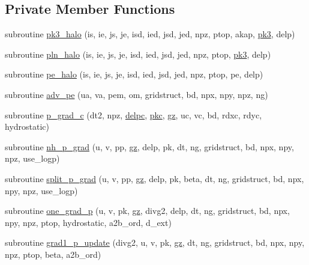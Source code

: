 \subsection*{Private Member Functions}
\begin{DoxyCompactItemize}
\item 
subroutine \hyperlink{classdyn__core__mod_acb7593139a5dd1dd95e85ea109885036}{pk3\-\_\-halo} (is, ie, js, je, isd, ied, jsd, jed, npz, ptop, akap, \hyperlink{classdyn__core__mod_a6d4525d6fbfd6de35414635dd9f0caea}{pk3}, delp)
\item 
subroutine \hyperlink{classdyn__core__mod_a8eb71dd48e79318207c79f8c5c785619}{pln\-\_\-halo} (is, ie, js, je, isd, ied, jsd, jed, npz, ptop, \hyperlink{classdyn__core__mod_a6d4525d6fbfd6de35414635dd9f0caea}{pk3}, delp)
\item 
subroutine \hyperlink{classdyn__core__mod_a7a28a4d13bab7c8fdbb2704159ec57de}{pe\-\_\-halo} (is, ie, js, je, isd, ied, jsd, jed, npz, ptop, pe, delp)
\item 
subroutine \hyperlink{classdyn__core__mod_a69d9914e89faeebfc49e822b23cf252d}{adv\-\_\-pe} (ua, va, pem, om, gridstruct, bd, npx, npy, npz, ng)
\item 
subroutine \hyperlink{classdyn__core__mod_a93144665e79c95c709361c52734b4f1b}{p\-\_\-grad\-\_\-c} (dt2, npz, \hyperlink{classdyn__core__mod_aa4417385939b0cafbeadaa424ed3c914}{delpc}, \hyperlink{classdyn__core__mod_ab8b896d9a395406f68b58a26d444f9bf}{pkc}, \hyperlink{classdyn__core__mod_add08631b5675064954c9123f29da8d9c}{gz}, uc, vc, bd, rdxc, rdyc, hydrostatic)
\item 
subroutine \hyperlink{classdyn__core__mod_a42c75f9401e5bee9bbe18cef49b1e14e}{nh\-\_\-p\-\_\-grad} (u, v, pp, \hyperlink{classdyn__core__mod_add08631b5675064954c9123f29da8d9c}{gz}, delp, pk, dt, ng, gridstruct, bd, npx, npy, npz, use\-\_\-logp)
\item 
subroutine \hyperlink{classdyn__core__mod_adc04150e3da9d17590f1d3f3c6b6aace}{split\-\_\-p\-\_\-grad} (u, v, pp, \hyperlink{classdyn__core__mod_add08631b5675064954c9123f29da8d9c}{gz}, delp, pk, beta, dt, ng, gridstruct, bd, npx, npy, npz, use\-\_\-logp)
\item 
subroutine \hyperlink{classdyn__core__mod_aab4c66667e9910926b19e1c83c5e1fe2}{one\-\_\-grad\-\_\-p} (u, v, pk, \hyperlink{classdyn__core__mod_add08631b5675064954c9123f29da8d9c}{gz}, divg2, delp, dt, ng, gridstruct, bd, npx, npy, npz, ptop, hydrostatic, a2b\-\_\-ord, d\-\_\-ext)
\item 
subroutine \hyperlink{classdyn__core__mod_a1c91c8f82a1ab87b6ea176c93f24bf4a}{grad1\-\_\-p\-\_\-update} (divg2, u, v, pk, \hyperlink{classdyn__core__mod_add08631b5675064954c9123f29da8d9c}{gz}, dt, ng, gridstruct, bd, npx, npy, npz, ptop, beta, a2b\-\_\-ord)

\end{DoxyCompactItemize}
